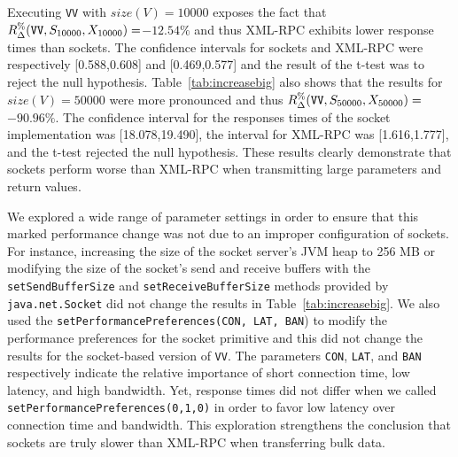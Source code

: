 \documentclass{sig-alternate}
\begin{document}

Executing {\tt VV} with $size(V)=10000$ exposes the fact that
{\small$R_\Delta^\%(\mbox{{\tt VV}},S_{10000},X_{10000})=$}$-12.54\%$
and thus XML-RPC exhibits lower response times than sockets.  The
confidence intervals for sockets and XML-RPC were respectively
[0.588,0.608] and [0.469,0.577] and the result of the t-test was to
reject the null hypothesis.  Table~\ref{tab:increasebig} also shows
that the results for $size(V)=50000$ were more pronounced and thus
{\small$R_\Delta^\%(\mbox{{\tt VV}},S_{50000},X_{50000})=$}$-90.96\%$.
The confidence interval for the responses times of the socket
implementation was [18.078,19.490], the interval for XML-RPC was
[1.616,1.777], and the t-test rejected the null hypothesis.  These
results clearly demonstrate that sockets perform worse than XML-RPC
when transmitting large parameters and return values.




We explored a wide range of parameter settings in order to ensure that
this marked performance change was not due to an improper
configuration of sockets.  For instance, increasing the size of the
socket server's JVM heap to 256 MB or modifying the size of the
socket's send and receive buffers with the {\tt setSendBufferSize} and
{\tt setReceiveBufferSize} methods provided by {\tt java.net.Socket}
did not change the results in Table~\ref{tab:increasebig}.  We also
used the {\tt setPerformancePreferences(CON, LAT, BAN}) to modify the
performance preferences for the socket primitive and this did not
change the results for the socket-based version of {\tt VV}.  The
parameters {\tt CON}, {\tt LAT}, and {\tt BAN} respectively indicate
the relative importance of short connection time, low latency, and
high bandwidth.  Yet, response times did not differ when we called
{\tt setPerformancePreferences(0,1,0)} in order to favor low latency
over connection time and bandwidth.  This exploration strengthens the
conclusion that sockets are truly slower than XML-RPC when
transferring bulk data.
\end{document}
